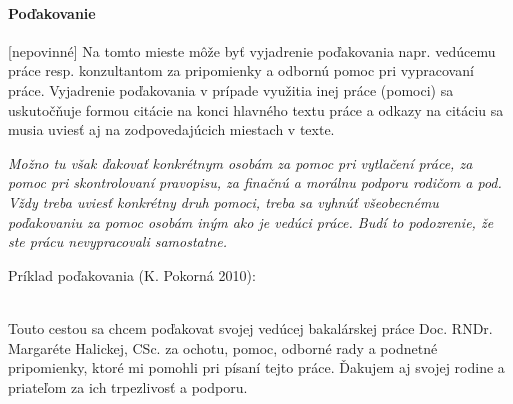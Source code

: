 

\vfill
\thispagestyle{empty}
\paragraph{Poďakovanie}[nepovinné]
Na tomto mieste môže byť vyjadrenie poďakovania napr. vedúcemu práce resp. konzultantom za pripomienky a odbornú pomoc pri vypracovaní práce. Vyjadrenie poďakovania v prípade využitia inej práce (pomoci) sa uskutočňuje formou citácie na konci hlavného textu práce a odkazy na citáciu sa musia uviesť aj na zodpovedajúcich miestach v texte. 

{\it Možno tu však ďakovať konkrétnym osobám za pomoc pri vytlačení práce, za pomoc pri skontrolovaní pravopisu, za finačnú a morálnu podporu rodičom a pod. Vždy treba uviesť konkrétny druh pomoci, treba sa vyhnúť všeobecnému poďakovaniu za pomoc osobám iným ako je vedúci práce. Budí to podozrenie,  že ste prácu nevypracovali samostatne. 

Príklad poďakovania (K. Pokorná 2010):} \\
Touto cestou sa chcem poďakovat svojej vedúcej bakalárskej práce Doc. RNDr. Margaréte Halickej, CSc. za ochotu, pomoc, odborné rady a podnetné pripomienky, ktoré mi pomohli pri písaní tejto práce. Ďakujem aj svojej rodine a priateľom za ich trpezlivosť a podporu.
